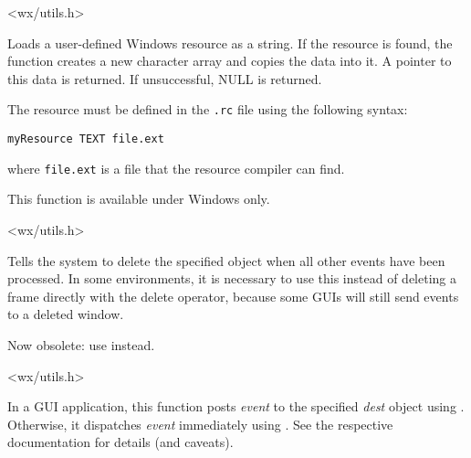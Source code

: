 
<wx/utils.h>


\label{wxloaduserresource}


Loads a user-defined Windows resource as a string. If the resource is found, the function creates
a new character array and copies the data into it. A pointer to this data is returned. If unsuccessful, NULL is returned.

The resource must be defined in the {\tt .rc} file using the following syntax:

\begin{verbatim}
myResource TEXT file.ext
\end{verbatim}

where {\tt file.ext} is a file that the resource compiler can find.

This function is available under Windows only.


<wx/utils.h>


\label{wxpostdelete}


Tells the system to delete the specified object when
all other events have been processed. In some environments, it is
necessary to use this instead of deleting a frame directly with the
delete operator, because some GUIs will still send events to a deleted window.

Now obsolete: use  instead.


<wx/utils.h>


\label{wxpostevent}


In a GUI application, this function posts {\it event} to the specified {\it dest}
object using .
Otherwise, it dispatches {\it event} immediately using
.
See the respective documentation for details (and caveats).


